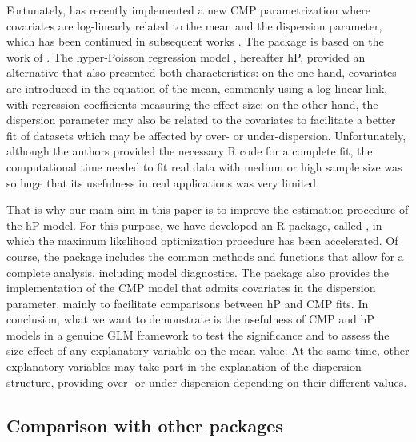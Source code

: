 Fortunately, \citet{huang} has recently implemented a new CMP parametrization where covariates are log-linearly related to the mean and the dispersion parameter, which has been continued in subsequent works \citep{huang19, ribeiro19, forthmann20}. The  package is based on the work of \citet{huang}. The hyper-Poisson regression model \citep{hp, lord, Saez-Castillo2017}, hereafter hP, provided an alternative that also presented both characteristics: on the one hand, covariates are introduced in the equation of the mean, commonly using a log-linear link, with regression coefficients measuring the effect size; on the other hand, the dispersion parameter may also be related to the covariates to facilitate a better fit of datasets which may be affected by over- or under-dispersion. Unfortunately, although the authors provided the necessary R code for a complete fit, the computational time needed to fit real data with medium or high sample size was so huge that its usefulness in real applications was very limited.

That is why our main aim in this paper is to improve the estimation procedure of the hP model. For this purpose, we have developed an R package, called , in which the maximum likelihood optimization procedure has been accelerated. Of course, the package includes the  common methods and functions that allow for a complete analysis, including model diagnostics. The package also provides the \citet{huang} implementation of the CMP model that admits covariates in the dispersion parameter, mainly to facilitate comparisons between hP and CMP fits. In conclusion, what we want to demonstrate is the usefulness of CMP and hP models in a genuine GLM framework to test the significance and to assess the size effect of any explanatory variable on the mean value. At the same time, other explanatory variables may take part in the explanation of the dispersion structure, providing over- or under-dispersion depending on their different values.

\subsection{Comparison with other packages}

